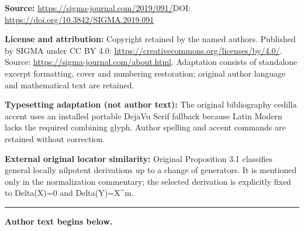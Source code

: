 \documentclass[11pt]{article}
\numberwithin{equation}{section}
\begin{document}
\noindent\textbf{Source:} \url{https://sigma-journal.com/2019/091/}\quad DOI: \url{https://doi.org/10.3842/SIGMA.2019.091}\par
\noindent\textbf{License and attribution:} Copyright retained by the named authors. Published by SIGMA under CC BY 4.0: \url{https://creativecommons.org/licenses/by/4.0/}. Source: \url{https://sigma-journal.com/about.html}. Adaptation consists of standalone excerpt formatting, cover and numbering restoration; original author language and mathematical text are retained.\par
\noindent\textbf{Typesetting adaptation (not author text):} The original bibliography cedilla accent uses an installed portable DejaVu Serif fallback because Latin Modern lacks the required combining glyph. Author spelling and accent commands are retained without correction.\par
\noindent\textbf{External original locator similarity:} Original Proposition 3.1 classifies general locally nilpotent derivations up to a change of generators. It is mentioned only in the normalization commentary; the selected derivation is explicitly fixed to Delta(X)=0 and Delta(Y)=X\textasciicircum{}m.\par
\medskip\hrule\medskip\noindent\textbf{Author text begins below.}\par
\setcounter{section}{0}
\setcounter{subsection}{0}
\setcounter{subsubsection}{0}
\setcounter{Theorem}{0}
\setcounter{equation}{0}
\end{document}
